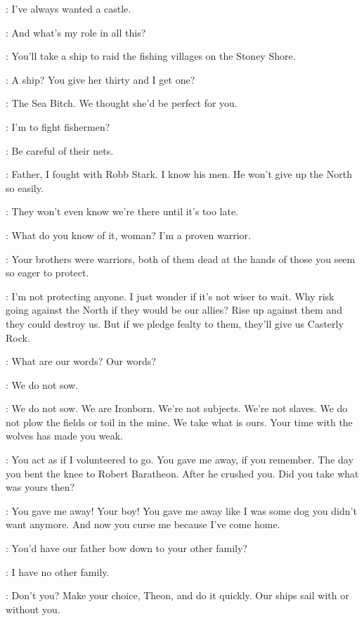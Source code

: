 \YARA: I've always wanted a castle. 

\THEON: And what's my role in all this? 

\BALON: You'll take a ship to raid the fishing villages on the Stoney Shore. 

\THEON: A ship? You give her thirty and I get one? 

\YARA: The Sea Bitch. We thought she'd be perfect for you. 

\THEON: I'm to fight fishermen? 

\YARA: Be careful of their nets. 

\THEON: Father, I fought with Robb Stark. I know his men. He won't give up the North so easily. 

\YARA: They won't even know we're there until it's too late. 

\THEON: What do you know of it, woman? I'm a proven warrior. 

\BALON: Your brothers were warriors, both of them dead at the hands of those you seem so eager to protect. 

\THEON: I'm not protecting anyone. I just wonder if it's not wiser to wait. Why risk going against the North if they would be our allies? Rise up against them and they could destroy us. But if we pledge fealty to them, they'll give us Casterly Rock. 

\BALON: What are our words? Our words? 

\THEON: We do not sow. 

\BALON: We do not sow. We are Ironborn. We're not subjects. We're not slaves. We do not plow the fields or toil in the mine. We take what is ours. Your time with the wolves has made you weak. 

\THEON: You act as if I volunteered to go. You gave me away, if you remember. The day you bent the knee to Robert Baratheon. After he crushed you. Did you take what was yours then? 


\THEON: You gave me away! Your boy! You gave me away like I was some dog you didn't want anymore. And now you curse me because I've come home. 

\YARA: You'd have our father bow down to your other family? 

\THEON: I have no other family. 

\BALON: Don't you? Make your choice, Theon, and do it quickly. Our ships sail with or without you. 


